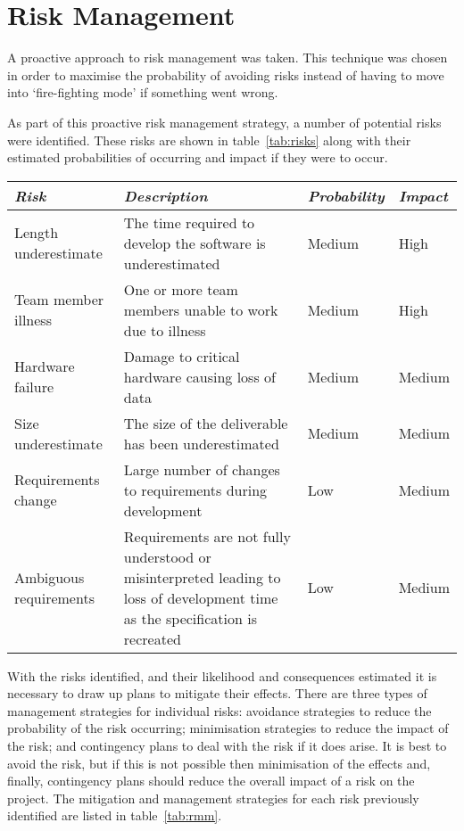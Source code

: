 \section{Risk Management}
\label{section:risk}
 
A proactive approach to risk management was taken. This technique was chosen in order
to maximise the probability of avoiding risks instead of having to move into `fire-fighting mode'
if something went wrong.
 
As part of this proactive risk management strategy, a number of potential risks were identified.
These risks are shown in table~\ref{tab:risks} along with their estimated probabilities of occurring
and impact if they were to occur.
 
\begin{table*}
	\small
	\begin{tabular}{l p{} l l}
		\toprule
		\emph{Risk} & \emph{Description} & \emph{Probability} & \emph{Impact} \\
		\midrule
		Length underestimate & The time required to develop the software is underestimated & Medium & High \\
		Team member illness & One or more team members unable to work due to illness & Medium & High \\
		Hardware failure & Damage to critical hardware causing loss of data & Medium & Medium \\
		Size underestimate & The size of the deliverable has been underestimated & Medium & Medium \\
		Requirements change & Large number of changes to requirements during development & Low & Medium \\
		Ambiguous requirements & Requirements are not fully understood or misinterpreted leading to
			loss of development time as the specification is recreated & Low & Medium \\
		\bottomrule
	\end{tabular}
	\vspace{1.5em}
	\caption{Risk identification and analysis.}
	\label{tab:risks}
\end{table*}
 
With the risks identified, and their likelihood and consequences estimated it is necessary
to draw up plans to mitigate their effects. There are three types of management strategies 
for individual risks: avoidance strategies to reduce the probability of the risk occurring;
minimisation strategies to reduce the impact of the risk; and contingency plans to deal with
the risk if it does arise. It is best to avoid the risk,
but if this is not possible then minimisation of the effects and, finally, contingency plans
should reduce the overall impact of a risk on the project. The mitigation and management
strategies for each risk previously identified are listed in table~\ref{tab:rmm}.
 

